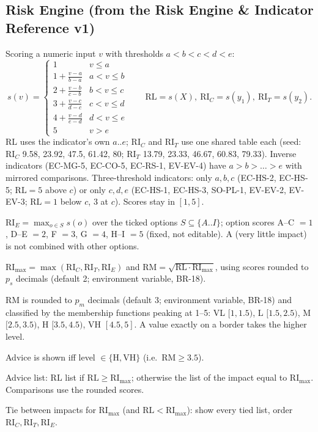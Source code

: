 \documentclass[11pt,a4paper]{article}
\newcommand{\RL}{\mathrm{RL}}
\newcommand{\RIC}{\mathrm{RI}_{C}}
\newcommand{\RIT}{\mathrm{RI}_{T}}
\newcommand{\RIE}{\mathrm{RI}_{E}}
\newcommand{\RImax}{\mathrm{RI}_{\max}}
\newcommand{\RM}{\mathrm{RM}}
\newcommand{\lv}[1]{\mathrm{#1}}
\begin{document}
\subsection*{Risk Engine (from the Risk Engine \& Indicator Reference v1)}
\begin{description}[style=nextline,leftmargin=1.6cm,labelwidth=1.4cm,font=\bfseries\color{creBlue}]
\item[BR-01] Scoring a numeric input $v$ with thresholds $a<b<c<d<e$:
\[
s(v)=\begin{cases}
1 & v\le a\\
1+\frac{v-a}{b-a} & a<v\le b\\[2pt]
2+\frac{v-b}{c-b} & b<v\le c\\[2pt]
3+\frac{v-c}{d-c} & c<v\le d\\[2pt]
4+\frac{v-d}{e-d} & d<v\le e\\
5 & v>e
\end{cases}
\qquad \RL=s(X),\ \RIC=s(y_1),\ \RIT=s(y_2).
\]
$\RL$ uses the indicator's own $a..e$; $\RIC$ and $\RIT$ use one shared table each (seed: $\RIC$ 9.58, 23.92, 47.5, 61.42, 80; $\RIT$ 13.79, 23.33, 46.67, 60.83, 79.33). Inverse indicators (EC-MG-5, EC-CO-5, EC-RS-1, EV-EV-4) have $a>b>\dots>e$ with mirrored comparisons. Three-threshold indicators: only $a,b,c$ (EC-HS-2, EC-HS-5; $\RL=5$ above $c$) or only $c,d,e$ (EC-HS-1, EC-HS-3, SO-PL-1, EV-EV-2, EV-EV-3; $\RL=1$ below $c$, 3 at $c$). Scores stay in $[1,5]$.
\item[BR-02] $\RIE = \max_{o \in S} s(o)$ over the ticked options $S\subseteq\{A..I\}$; option scores A--C $=1$, D--E $=2$, F $=3$, G $=4$, H--I $=5$ (fixed, not editable). A (very little impact) is not combined with other options.
\item[BR-03] $\RImax = \max(\RIC,\RIT,\RIE)$ and $\RM = \sqrt{\RL \cdot \RImax}$, using scores rounded to $p_s$ decimals (default 2; environment variable, BR-18).
\item[BR-04] $\RM$ is rounded to $p_m$ decimals (default 3; environment variable, BR-18) and classified by the membership functions peaking at 1--5: VL $[1,1.5)$, L $[1.5,2.5)$, M $[2.5,3.5)$, H $[3.5,4.5)$, VH $[4.5,5]$. A value exactly on a border takes the higher level.
\item[BR-05] Advice is shown iff level $\in\{\lv{H},\lv{VH}\}$ (i.e.\ $\RM\ge3.5$).
\item[BR-06] Advice list:
$\RL$ list if $\RL \ge \RImax$; otherwise the list of the impact equal to $\RImax$. Comparisons use the rounded scores.
\item[BR-07] Tie between impacts for $\RImax$ (and $\RL < \RImax$): show every tied list, order $\RIC,\RIT,\RIE$.
\end{description}
\end{document}
